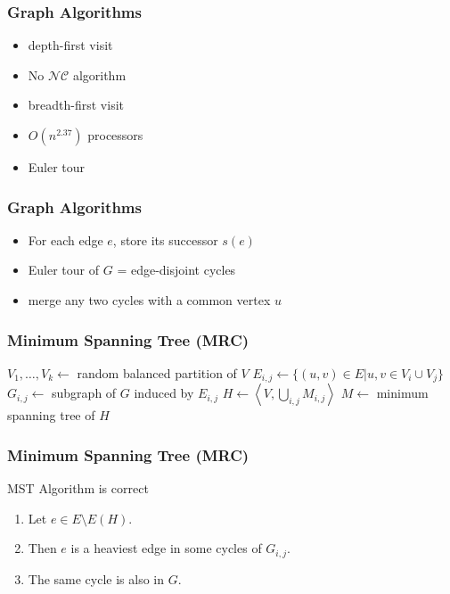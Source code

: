 \documentclass[14pt]{beamer}
\begin{document}
\begin{frame}\frametitle{Graph Algorithms}
  \begin{itemize}
  \item
    depth-first visit
  \item
    No $\mathcal{NC}$ algorithm
  \item
    breadth-first visit
  \item
    $O(n^{2.37})$ processors
  \item
    \alert{Euler tour}
  \end{itemize}
\end{frame}

\begin{frame}\frametitle{Graph Algorithms}
  \begin{itemize}
  \item
    For each edge $e$, store its successor $s(e)$
  \item
    Euler tour of $G$ = edge-disjoint cycles
  \item
    merge any two cycles with a common vertex $u$
  \end{itemize}
\end{frame}

\begin{frame}\frametitle{Minimum Spanning Tree (MRC)}
  \begin{algorithm}[H]

    $V_{1}, \ldots, V_{k} \gets $ random balanced partition of $V$\;
    $E_{i,j} \gets \{(u, v) \in E | u, v \in V_{i} \cup V_{j} \}$\;
    $G_{i,j} \gets $ subgraph of $G$ induced by $E_{i,j}$\;
    $H \gets \left\langle V, \bigcup_{i,j} M_{i,j}\right\rangle $\;
    $M \gets$ minimum spanning tree of $H$\;
    \label{alg:MRC-MST}
    \caption{MST}
  \end{algorithm}
\end{frame}

\begin{frame}\frametitle{Minimum Spanning Tree (MRC)}
  \begin{block}{MST Algorithm is correct}
    \begin{enumerate}
      \item
    Let $e\in E\setminus E(H)$.
      \item
    Then $e$ is a heaviest edge in some cycles of $G_{i,j}$.
      \item
    The same cycle is also in $G$.
  \end{enumerate}
\end{block}
\end{frame}
\end{document}
